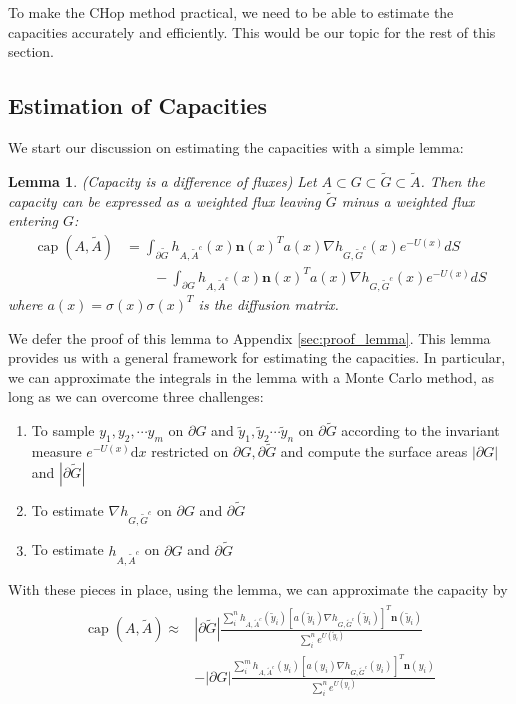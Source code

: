 \documentclass[english, aip, jcp, priprint, graphicx,floatfix]{revtex4-1}
\newtheorem{lemma}{Lemma}
\theoremstyle{plain}
\theoremstyle{definition}
\theoremstyle{plain}
\begin{document}
To make the CHop method practical, we need to be able to estimate the capacities accurately and efficiently. This would be our topic for the rest of this section.

\subsection{Estimation of Capacities}

We start our discussion on estimating the capacities with a simple lemma:
\begin{lemma}(Capacity is a difference of fluxes) \label{lem:capacity_lemma} Let $A\subset G \subset \tilde G \subset \tilde A$.  Then the capacity can be expressed as a weighted flux leaving $\tilde G$ minus a weighted flux entering $G$:
\begin{align*}
\ensuremath{\operatorname{cap}} (A, \tilde{A}) &= \int_{\partial \tilde G}  h_{A, \tilde{A}^c} (x)   \textbf{n}(x)^T a (x) \nabla h_{G, \tilde{G}^c} (x)e^{- U (x)} dS \\
&\qquad - \int_{\partial G}  h_{A, \tilde{A}^c} (x)   \textbf{n}(x)^T a (x) \nabla h_{G, \tilde{G}^c} (x)e^{- U (x)} dS 
\end{align*}
where $a(x)=\sigma(x)\sigma(x)^T$ is the diffusion matrix.
\end{lemma}

We defer the proof of this lemma to Appendix \ref{sec:proof_lemma}. This lemma provides us with a general framework for estimating the capacities.   In particular, we can approximate the integrals in the lemma with a Monte Carlo method, as long as we can overcome three challenges:
\begin{enumerate}
    \item To sample $y_1,y_2,\cdots y_m$ on $\partial G$ and $\tilde y_1,\tilde y_2 \cdots \tilde y_n$ on $\partial \tilde{G}$ according to the invariant measure $e^{- U(x)}\mathrm{d}x$ restricted on $\partial G, \partial \tilde{G}$ and compute the surface areas $|\partial G|$ and $|\partial \tilde G|$

\item To estimate $\nabla h_{G, \tilde{G}^c}$ on $\partial G$ and
$\partial \tilde{G}$

\item To estimate $h_{A, \tilde{A}^c}$ on $\partial G$ and $\partial
\tilde{G}$
\end{enumerate}
With these pieces in place, using the lemma, we can approximate the capacity by
\begin{gather}\label{eq:capesteq}
\begin{array}{cc}
\ensuremath{\operatorname{cap}} (A, \tilde{A}) \approx & 
|\partial \tilde G|\frac{\sum_i^n h_{A,\tilde A^c}(\tilde y_i)[a(\tilde y_i)\nabla h_{G,\tilde G^c}(\tilde y_i)]^T \textbf{n}(\tilde y_i)}{\sum_i^n e^{U(\tilde y_i)}} \\
& - |\partial G|\frac{\sum_i^m h_{A,\tilde A^c}(y_i)[a(y_i)\nabla h_{G,\tilde G^c}(y_i)]^T \textbf{n}(y_i)}{\sum_i^n e^{U(y_i)}} 
\end{array}
\end{gather}
\end{document}
